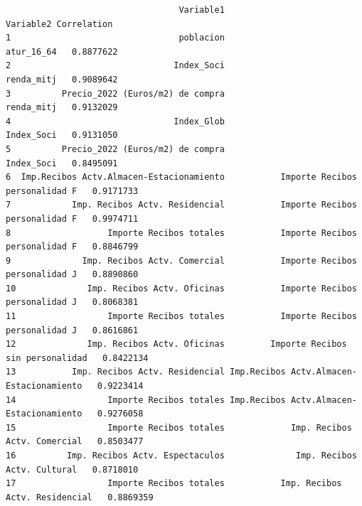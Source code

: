 \documentclass[notspecified,article,submit,moreauthors,pdftex]{Definitions/mdpi}
\begin{document}
\begin{verbatim}
                                  Variable1                                Variable2 Correlation
1                                 poblacion                               atur_16_64   0.8877622
2                                Index_Soci                               renda_mitj   0.9089642
3          Precio_2022 (Euros/m2) de compra                               renda_mitj   0.9132029
4                                Index_Glob                               Index_Soci   0.9131050
5          Precio_2022 (Euros/m2) de compra                               Index_Soci   0.8495091
6  Imp.Recibos Actv.Almacen-Estacionamiento           Importe Recibos personalidad F   0.9171733
7            Imp. Recibos Actv. Residencial           Importe Recibos personalidad F   0.9974711
8                   Importe Recibos totales           Importe Recibos personalidad F   0.8846799
9              Imp. Recibos Actv. Comercial           Importe Recibos personalidad J   0.8890860
10              Imp. Recibos Actv. Oficinas           Importe Recibos personalidad J   0.8068381
11                  Importe Recibos totales           Importe Recibos personalidad J   0.8616861
12              Imp. Recibos Actv. Oficinas         Importe Recibos sin personalidad   0.8422134
13           Imp. Recibos Actv. Residencial Imp.Recibos Actv.Almacen-Estacionamiento   0.9223414
14                  Importe Recibos totales Imp.Recibos Actv.Almacen-Estacionamiento   0.9276058
15                  Importe Recibos totales             Imp. Recibos Actv. Comercial   0.8503477
16          Imp. Recibos Actv. Espectaculos              Imp. Recibos Actv. Cultural   0.8718010
17                  Importe Recibos totales           Imp. Recibos Actv. Residencial   0.8869359
\end{verbatim}
\end{document}

